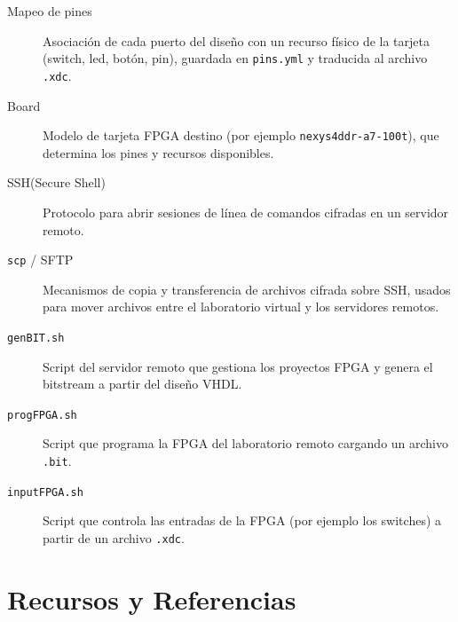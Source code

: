 \documentclass[12pt, a4paper, twoside, openany]{book}
\newcommand{\vhdl}{\textsc{VHDL}\xspace}
\newcommand{\ssh}{\textsc{SSH}\xspace}
\begin{document}
\begin{description}
  \item[Mapeo de pines] Asociación de cada puerto del diseño con un recurso
        físico de la tarjeta (switch, led, botón, pin), guardada en
        \texttt{pins.yml} y traducida al archivo \texttt{.xdc}.
  \item[Board] Modelo de tarjeta FPGA destino (por ejemplo
        \texttt{nexys4ddr-a7-100t}), que determina los pines y recursos
        disponibles.
  \item[\ssh (Secure Shell)] Protocolo para abrir sesiones de línea de comandos
        cifradas en un servidor remoto.
  \item[\texttt{scp} / SFTP] Mecanismos de copia y transferencia de archivos
        cifrada sobre \ssh, usados para mover archivos entre el laboratorio
        virtual y los servidores remotos.
  \item[\texttt{genBIT.sh}] Script del servidor remoto que gestiona los
        proyectos FPGA y genera el bitstream a partir del diseño \vhdl.
  \item[\texttt{progFPGA.sh}] Script que programa la FPGA del laboratorio
        remoto cargando un archivo \texttt{.bit}.
  \item[\texttt{inputFPGA.sh}] Script que controla las entradas de la FPGA
        (por ejemplo los switches) a partir de un archivo \texttt{.xdc}.
\end{description}

\chapter{Recursos y Referencias}
\label{apx:recursos}
\end{document}
